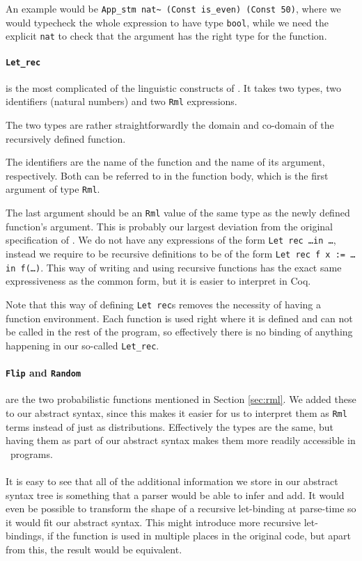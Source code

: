 \documentclass[11pt, leqno, titlepage]{article}
\def\coqe{\lstinline[language=Coq, basicstyle=\small]}
\theoremstyle{definition}
\begin{document}
An example would be \coqe{App_stm nat~ (Const is_even) (Const 50)}, where we would
typecheck the whole expression to have type \coqe{bool}, while we need the explicit
\coqe{nat} to check that the argument has the right type
for the function.

\paragraph{\coqe{Let_rec}} is the most complicated of the linguistic constructs of
\rmlx. It takes two types, two identifiers (natural numbers) and two \coqe{Rml}
expressions.

The two types are rather straightforwardly the domain and co-domain of the
recursively defined function.

The identifiers are the name of the function and the name of its argument,
respectively. Both can be referred to in the function body, which is the first
argument of type \coqe{Rml}.

The last argument should be an \coqe{Rml} value of the same type as the newly defined
function's argument. This is probably our largest deviation from the original
specification of \rml. We do not have any expressions of the form \texttt{Let rec
  \dots in \dots}, instead we require to be recursive definitions to be of the form
\texttt{Let rec f x := \dots in f(\dots)}. This way of writing and using recursive
functions has the exact same expressiveness as the common form, but it is easier to
interpret in Coq.

Note that this way of defining \texttt{Let rec}s removes the necessity of having a
function environment. Each function is used right where it is defined and can not be
called in the rest of the program, so effectively there is no binding of anything
happening in our so-called \coqe{Let_rec}. 

\paragraph{\coqe{Flip} and \coqe{Random}} are the two probabilistic functions
mentioned in Section \ref{sec:rml}. We added these to our abstract syntax, since this
makes it easier for us to interpret them as \coqe{Rml} terms instead of just as
distributions. Effectively the types are the same, but having them as part of our
abstract syntax makes them more readily accessible in \rmlx\ programs. \\
\\
It is easy to see that all of the additional information we store in our abstract
syntax tree is something that a parser would be able to infer and add. It would even
be possible to transform the shape of a recursive let-binding at parse-time so it
would fit our abstract syntax. This might introduce more recursive let-bindings, if
the function is used in multiple places in the original code, but apart from this,
the result would be equivalent. 
\end{document}
